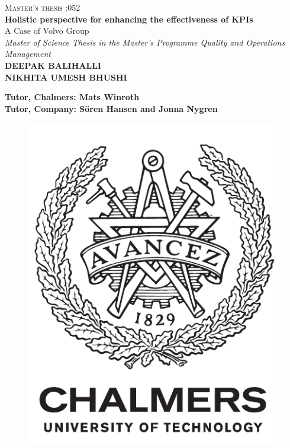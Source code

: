 \newpage
\restoregeometry
\thispagestyle{empty}
\mbox{}


\newpage
\thispagestyle{empty}
\begin{center}
	\textsc{\large Master's thesis \the\year:052}\\[4cm]		%
	\textbf{\Large  Holistic perspective for enhancing the effectiveness of KPIs \ } \\[1cm]
	{\large A Case of Volvo Group\\\emph{Master of Science Thesis in the Master’s Programme Quality and Operations Management}}\\[1cm]

	\textbf{\large DEEPAK BALIHALLI}\\
	\textbf{\large NIKHITA UMESH BHUSHI}\\
\vspace{6mm}





	\textbf{Tutor, Chalmers: Mats Winroth}\\ %
    \textbf{Tutor, Company: Sören Hansen and Jonna Nygren} %

	
	\vfill	
	\begin{figure}[H]
	\centering
	\includegraphics[width=0.2\pdfpagewidth]{figure/auxiliary/logo_eng.pdf} \\	
	\end{figure}	\vspace{4mm}	
	

\end{center}
